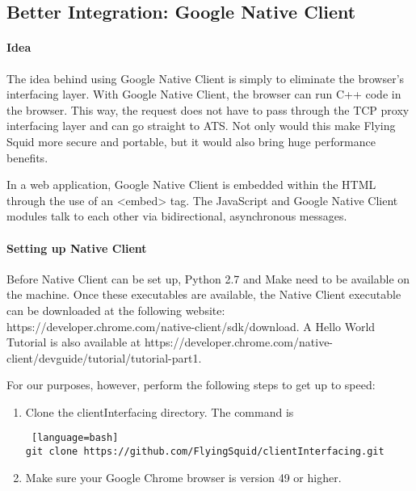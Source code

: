 \begin{appendices}



\section{Better Integration: Google Native Client \cite{Google Native Client}}

\paragraph{Idea}

The idea behind using Google Native Client is simply to eliminate the browser's interfacing layer. With Google Native Client, the browser can run C++ code in the browser. This way, the request does not have to pass through the TCP proxy interfacing layer and can go straight to ATS. Not only would this make Flying Squid more secure and portable, but it would also bring huge performance benefits.

In a web application, Google Native Client is embedded within the HTML through the use of an <embed> tag. The JavaScript and Google Native Client modules talk to each other via bidirectional, asynchronous messages.

\paragraph{Setting up Native Client}

Before Native Client can be set up, Python 2.7 and Make need to be available on the machine. Once these executables are available, the Native Client executable can be downloaded at the following website: https://developer.chrome.com/native-client/sdk/download. A Hello World Tutorial is also available at https://developer.chrome.com/native-client/devguide/tutorial/tutorial-part1.

For our purposes, however, perform the following steps to get up to speed:

\begin{enumerate} 
\item Clone the clientInterfacing directory. The command is 

\begin{lstlisting} [language=bash] 
git clone https://github.com/FlyingSquid/clientInterfacing.git
\end{lstlisting}

\item  Make sure your Google Chrome browser is version 49 or higher.


\end{enumerate}
\end{appendices}
